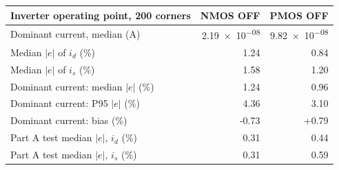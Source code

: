 \begin{tabular}{lrr}
\toprule
Inverter operating point, 200 corners & NMOS OFF & PMOS OFF \\
\midrule
Dominant current, median (A) & \num{2.19e-08} & \num{9.82e-08} \\
\midrule
Median $|e|$ of $i_d$ (\%) & 1.24 & 0.84 \\
Median $|e|$ of $i_s$ (\%) & 1.58 & 1.20 \\
Dominant current: median $|e|$ (\%) & 1.24 & 0.96 \\
Dominant current: P95 $|e|$ (\%) & 4.36 & 3.10 \\
Dominant current: bias (\%) & -0.73 & +0.79 \\
\midrule
Part A test median $|e|$, $i_d$ (\%) & 0.31 & 0.44 \\
Part A test median $|e|$, $i_s$ (\%) & 0.31 & 0.59 \\
\bottomrule
\end{tabular}
